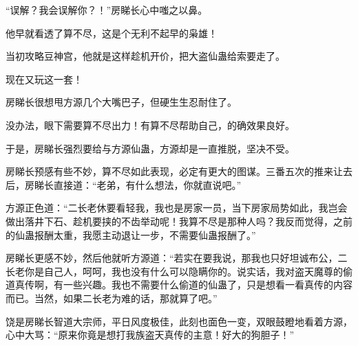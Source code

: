 \begin{this_body}
“误解？我会误解你？！”房睇长心中嗤之以鼻。

他早就看透了算不尽，这是个无利不起早的枭雄！

当初攻略豆神宫，他就是这样趁机开价，把大盗仙蛊给索要走了。

现在又玩这一套！

房睇长很想甩方源几个大嘴巴子，但硬生生忍耐住了。

没办法，眼下需要算不尽出力！有算不尽帮助自己，的确效果良好。

于是，房睇长强烈要给与方源仙蛊，方源却是一直推脱，坚决不受。

房睇长预感有些不妙，算不尽如此表现，必定有更大的图谋。三番五次的推来让去后，房睇长直接道：“老弟，有什么想法，你就直说吧。”

方源正色道：“二长老休要看轻我，我也是房家一员，当下房家局势如此，我岂会做出落井下石、趁机要挟的不齿举动呢！我算不尽是那种人吗？我反而觉得，之前的仙蛊报酬太重，我愿主动退让一步，不需要仙蛊报酬了。”

房睇长更感不妙，然后他就听方源道：“若实在要我说，那我也只好坦诚布公，二长老你是自己人，呵呵，我也没有什么可以隐瞒你的。说实话，我对盗天魔尊的偷道真传啊，有一些兴趣。我也不需要什么偷道的仙蛊了，只是想看一看真传的内容而已。当然，如果二长老为难的话，那就算了吧。”

饶是房睇长智道大宗师，平日风度极佳，此刻也面色一变，双眼鼓瞪地看着方源，心中大骂：“原来你竟是想打我族盗天真传的主意！好大的狗胆子！”

\end{this_body}

